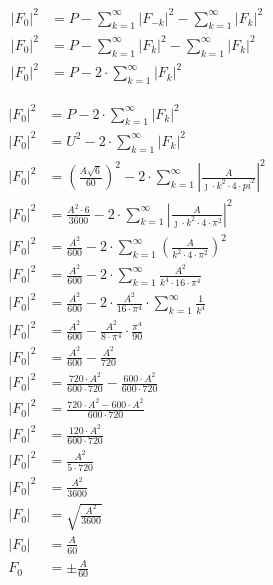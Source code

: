 \begin{task}

\begin{align*}
\left|F_0\right|^2 &= P - \sum_{k=1}^{\infty} \left|F_{-k}\right|^2 - \sum_{k=1}^{\infty} \left|F_k\right|^2\\
\left|F_0\right|^2 &= P - \sum_{k=1}^{\infty} \left|F_k\right|^2 - \sum_{k=1}^{\infty} \left|F_k\right|^2\\
\left|F_0\right|^2 &= P - 2 \cdot \sum_{k=1}^{\infty} \left|F_k\right|^2
\end{align*}


\begin{align*}
\left|F_0\right|^2 &= P - 2 \cdot \sum_{k=1}^{\infty} \left|F_k\right|^2\\
\left|F_0\right|^2 &= U^2 - 2 \cdot \sum_{k=1}^{\infty} \left|F_k\right|^2\\
\left|F_0\right|^2 &= \left(\frac{A\sqrt{6}}{60}\right)^2 - 2 \cdot \sum_{k=1}^{\infty} \left|\frac{A}{\jmath \cdot k^2 \cdot 4 \cdot pi^2}\right|^2\\
\left|F_0\right|^2 &= \frac{A^2 \cdot 6}{3600} - 2 \cdot \sum_{k=1}^{\infty} \left|\frac{A}{\jmath \cdot k^2 \cdot 4 \cdot \pi^2}\right|^2\\
\left|F_0\right|^2 &= \frac{A^2}{600} - 2 \cdot \sum_{k=1}^{\infty} \left(\frac{A}{k^2 \cdot 4 \cdot \pi^2}\right)^2\\
\left|F_0\right|^2 &= \frac{A^2}{600} - 2 \cdot \sum_{k=1}^{\infty} \frac{A^2}{k^4 \cdot 16 \cdot \pi^4}\\
\left|F_0\right|^2 &= \frac{A^2 }{600} - 2 \cdot \frac{A^2}{16 \cdot \pi^4} \cdot \sum_{k=1}^{\infty} \frac{1}{k^4}\\
\left|F_0\right|^2 &= \frac{A^2}{600} - \frac{A^2}{8 \cdot \pi^4} \cdot \frac{\pi^4}{90}\\
\left|F_0\right|^2 &= \frac{A^2}{600} - \frac{A^2}{720}\\
\left|F_0\right|^2 &= \frac{720 \cdot A^2}{600 \cdot 720} - \frac{600 \cdot A^2}{600 \cdot 720}\\
\left|F_0\right|^2 &= \frac{720 \cdot A^2 - 600 \cdot A^2}{600 \cdot 720}\\
\left|F_0\right|^2 &= \frac{120 \cdot A^2}{600 \cdot 720}\\
\left|F_0\right|^2 &= \frac{A^2}{5 \cdot 720}\\
\left|F_0\right|^2 &= \frac{A^2}{3600}\\
\left|F_0\right| &= \sqrt{\frac{A^2}{3600}}\\
\left|F_0\right| &= \frac{A}{60}\\
F_0 &= \pm \frac{A}{60}\\
\end{align*}


\end{task}